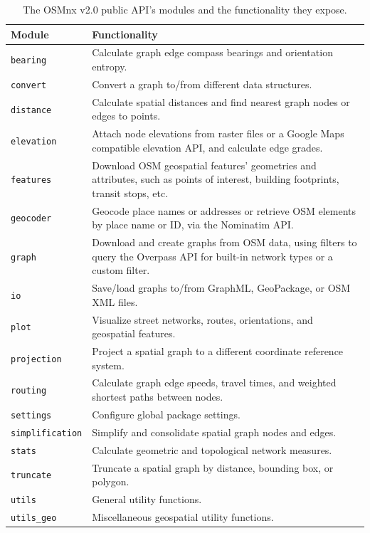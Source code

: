 \documentclass[12pt,letterpaper]{article} %
\begin{document}
\begin{table}[p!]
    \centering
    \caption{The OSMnx v2.0 public API's modules and the functionality they expose.}\label{tab:osmnx_modules}
    \begin{tabular}{lp{9.7cm}}
        \toprule
        Module &  Functionality \\
        \midrule
        \texttt{bearing}  & Calculate graph edge compass bearings and orientation entropy.\\
        \texttt{convert}  & Convert a graph to/from different data structures.\\
        \texttt{distance}  & Calculate spatial distances and find nearest graph nodes or edges to points.\\
        \texttt{elevation}  &  Attach node elevations from raster files or a Google Maps compatible elevation API, and calculate edge grades.\\
        \texttt{features}  &  Download OSM geospatial features' geometries and attributes, such as points of interest, building footprints, transit stops, etc.\\
        \texttt{geocoder}  & Geocode place names or addresses or retrieve OSM elements by place name or ID, via the Nominatim API.\\
        \texttt{graph}  & Download and create graphs from OSM data, using filters to query the Overpass API for built-in network types or a custom filter.\\
        \texttt{io}  & Save/load graphs to/from GraphML, GeoPackage, or OSM XML files.\\
        \texttt{plot} & Visualize street networks, routes, orientations, and geospatial features.  \\
        \texttt{projection}  &  Project a spatial graph to a different coordinate reference system.\\
        \texttt{routing}  &  Calculate graph edge speeds, travel times, and weighted shortest paths between nodes.\\
        \texttt{settings}  & Configure global package settings.\\
        \texttt{simplification}  & Simplify and consolidate spatial graph nodes and edges.\\
        \texttt{stats}  &  Calculate geometric and topological network measures.\\
        \texttt{truncate}  & Truncate a spatial graph by distance, bounding box, or polygon.\\
        \texttt{utils}  & General utility functions.\\
        \texttt{utils\_geo}  & Miscellaneous geospatial utility functions.\\
        \bottomrule
    \end{tabular}
\end{table}
\end{document}
